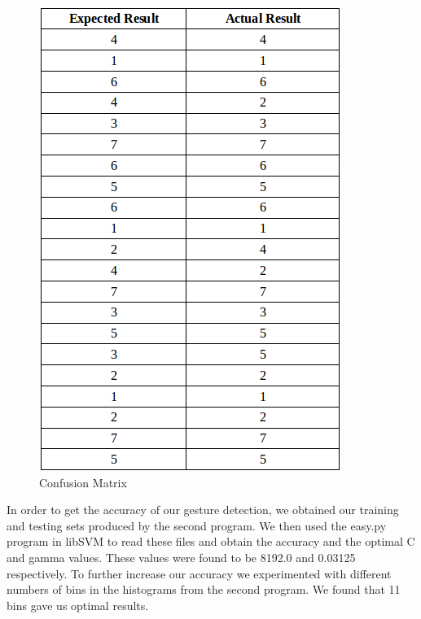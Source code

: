 \documentclass[11pt,conference]{IEEEtran}
\begin{document}
\begin{figure}[h]
\caption{Confusion Matrix}
\centering
\includegraphics[width=\linewidth]{confusion_matrix}
\end{figure}

In order to get the accuracy of our gesture detection, we obtained our training and testing sets produced by the second program. We then used the easy.py program in libSVM to read these files and obtain the accuracy and the optimal C and gamma values. These values were found to be 8192.0 and 0.03125 respectively. To further increase our accuracy we experimented with different numbers of bins in the histograms from the second program. We found that 11 bins gave us optimal results.
\end{document}
